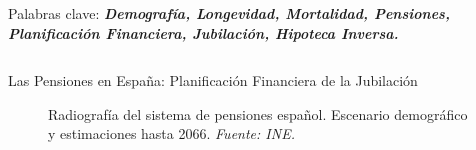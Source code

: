 \documentclass[]{beamer}
\begin{document}
\begin{frame}{\vspace{1ex}\hfill Palabras clave: \bfseries \textit{Demograf\'ia, Longevidad, Mortalidad, Pensiones, Planificaci\'on Financiera, Jubilaci\'on, Hipoteca Inversa.}}
\begin{columns}[t]
	
	\vspace{-1.5cm}   %
		
		\begin{block}{Las Pensiones en Espa\~na: Planificaci\'on Financiera de la Jubilaci\'on}
					\begin{figure}[h]
						\caption{\small Radiograf\'ia del sistema de pensiones espa\~nol. Escenario demogr\'afico y estimaciones hasta 2066. \textit{Fuente: INE.}}
						\label{pension1}
					\end{figure}\vspace{-1cm}
			\begin{multicols}{2}
					\begin{itemize}

\end{itemize}
\end{multicols}
\end{block}
\end{columns}
\end{frame}
\end{document}
